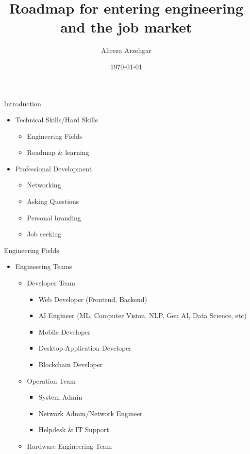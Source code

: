 \documentclass[xcolor={rgb}]{beamer}
\author{Alireza Arzehgar}
\title{Roadmap for entering engineering and the job market}
\date{\today}
\newcommand{\pitem}{\pause\item}
\begin{document}
	\begin{frame}[plain]
		\titlepage
	\end{frame}

	\begin{frame}{Introduction}
		\begin{itemize}
			\pitem Technical Skills/Hard Skills
			\begin{itemize}
				\item Engineering Fields
				\item Roadmap \& learning
			\end{itemize}

			\pitem Professional Development
			\begin{itemize}
				\item Networking
				\item Asking Questions
				\item Personal branding
				\item Job seeking
			\end{itemize}
		\end{itemize}
	\end{frame}

	\begin{frame}{Engineering Fields}
		\begin{itemize}
			\pitem Engineering Teams
			\begin{itemize}
				\pitem Developer Team
				\begin{itemize}
					\item Web Developer (Frontend, Backend)
					\item AI Engineer (ML, Computer Vision, NLP, Gen AI, Data Science, etc)
					\item Mobile Developer
					\item Desktop Application Developer
					\item Blockchain Developer
				\end{itemize}
				\pitem Operation Team
				\begin{itemize}
					\item System Admin
					\item Network Admin/Network Engineer
					\item Helpdesk \& IT Support
				\end{itemize}

				\pitem Hardware Engineering Team
			\end{itemize}
		\end{itemize}
	\end{frame}
\end{document}

